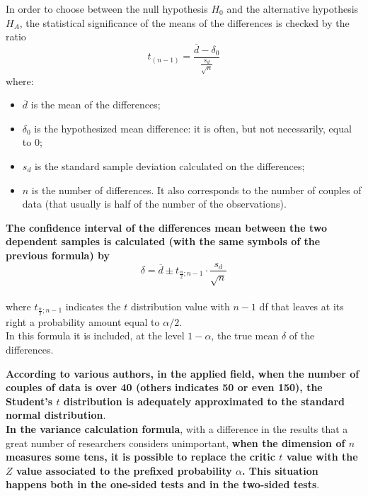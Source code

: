 \begin{frame}
  \vspace*{.25cm}
  In order to choose between the null hypothesis $H_0$ and the alternative hypothesis $H_A$, the statistical significance of the means of the differences is checked by the ratio
  $$t_{(n-1)}=\frac{\overline{d} - \delta_0}{\frac{s_d}{\sqrt{n}}}$$
  where:\\
  \begin{itemize}
    \item $ \overline{d} $ is the mean of the differences;
    \item $ \delta_0 $ is the hypothesized mean difference: it is often, but not necessarily, equal to 0;
    \item $ s_d $ is the standard sample deviation calculated on the differences;
    \item $ n $ is the number of differences. It also corresponds to the number of couples of data (that usually is half of the number of the observations).
  \end{itemize}
\end{frame}

\begin{frame}
  \vspace*{.25cm}
  \textbf{The confidence interval of the differences mean between the two dependent samples is calculated (with the same symbols of the previous formula) by}
  $$ \delta = \overline{d}\pm t_{\frac{\alpha}{2};n-1}\cdot \frac{s_d}{\sqrt{n}}$$\\
  where $t_{\frac{\alpha}{2};n-1}$ indicates the $ t $ distribution value with $ n - 1 $ df that leaves at its right a probability amount equal to $ \alpha/ 2$.\\
  \vspace*{.25cm}
  In this formula it is included, at the level $ 1-\alpha $, the true mean $ \delta $ of the differences.\\
\end{frame}

\begin{frame}
  \vspace*{.25cm}
  \textbf{According to various authors, in the applied field, when the number of couples of data is over 40 (others indicates 50 or even 150), the Student's $ t $ distribution is adequately approximated to the standard normal distribution}.\\
  \vspace*{.5cm}
  \textbf{In the variance calculation formula}, with a difference in the results that a great number of researchers considers unimportant, \textbf{when the dimension of {\boldmath$ n $} measures some tens, it is possible to replace the critic {\boldmath$ t $} value with the {\boldmath$ Z $} value associated to the prefixed probability   {\boldmath$\alpha$}. This situation happens both in the one-sided tests and in the two-sided tests}.
\end{frame}

